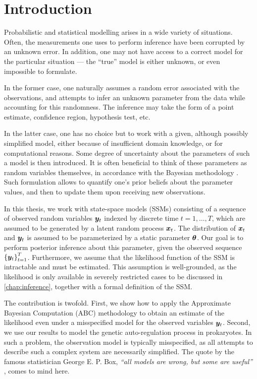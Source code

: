 \chapter{Introduction}
\label{chap:introduction}

Probabilistic and statistical modelling arises in a wide variety of situations. Often, the measurements one uses to perform inference have been corrupted by an unknown error. In addition, one may not have access to a correct model for the particular situation --- the ``true'' model is either unknown, or even impossible to formulate.

In the former case, one naturally assumes a random error associated with the observations, and attempts to infer an unknown parameter from the data while accounting for this randomness. The inference may take the form of a point estimate, confidence region, hypothesis test, etc.

In the latter case, one has no choice but to work with a given, although possibly simplified model, either because of insufficient domain knowledge, or for computational reasons. Some degree of uncertainty about the parameters of such a model is then introduced. It is often beneficial to think of these parameters as random variables themselves, in accordance with the Bayesian methodology \citep{bayes}. Such formulation allows to quantify one's prior beliefs about the parameter values, and then to update them upon receiving new observations.

In this thesis, we work with state-space models (SSMs) consisting of a sequence of observed random variables $\bm{y}_t$ indexed by discrete time $t = 1, \ldots, T$, which are assumed to be generated by a latent random process $\bm{x}_t$. The distribution of $\bm{x}_t$ and $\bm{y}_t$ is assumed to be parameterized by a static parameter $\bm{\theta}$. Our goal is to perform posterior inference about this parameter, given the observed sequence $\left\{\bm{y}_t\right\}_{t=1}^T$. Furthermore, we assume that the likelihood function of the SSM is intractable and must be estimated. This assumption is well-grounded, as the likelihood is only available in severely restricted cases to be discussed in \autoref{chap:inference}, together with a formal definition of the SSM.

The contribution is twofold. First, we show how to apply the Approximate Bayesian Computation (ABC) methodology \citep{abc-old-old, abc-old} to obtain an estimate of the likelihood even under a misspecified model for the observed variables $\bm{y}_t$. Second, we use our results to model the genetic auto-regulation process in prokaryotes. In such a problem, the observation model is typically misspecified, as all attempts to describe such a complex system are necessarily simplified. The quote by the famous statistician George E. P. Box, \emph{``all models are wrong, but some are useful''} \citep{box-quote}, comes to mind here.

